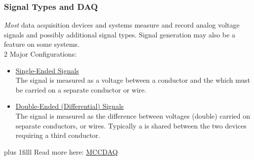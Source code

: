 \documentclass[fleqn]{beamer} %
\newcommand{\sectionIIsubsectionItitle}{Signal Types and DAQ}
\newcommand{\btVFill}{\vskip0pt plus 1filll}
\begin{document}
		    \begin{frame}[label=sectionIIsubsectionI]
				\frametitle{\sectionIIsubsectionItitle} \scriptsize

				{\it Most} data acquisition devices and systems measure and record {\BL analog} voltage signals and possibly additional signal types. Signal {\GR generation} may also be a feature on some systems. \vspace{5mm}\\

					2 Major Configurations:
					\begin{itemize}
						\item
						\underline{Single-Ended Signals} \vspace{0mm}\\
						The signal is measured as a voltage between a \underline{\hspace{20mm}} conductor and the \underline{\hspace{20mm}} which must be carried on a separate conductor or wire. \vspace{10mm}\\
					
						\item
						\underline{Double-Ended (Differential) Signals} \vspace{0mm}\\			
						The signal is measured as the {\PN difference} between \underline{\hspace{20mm}} voltages ({\PN double}) carried on separate conductors, or wires. Typically a \underline{\hspace{20mm}} is shared between the two devices requiring a third conductor. 
					\end{itemize}
				
					\btVFill
					\tiny{Read more here: \href{https://www.mccdaq.com/TechTips/TechTip-4.aspx}{MCCDAQ}}

			\end{frame}	
\end{document}
